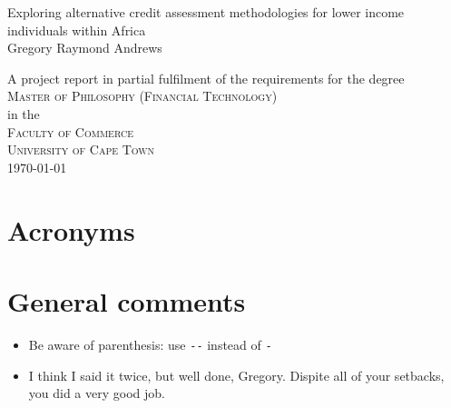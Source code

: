 \documentclass[a4paper,11pt,fleqn]{report}
\begin{document}
	
\thispagestyle{empty}


\begin{center}
	{\huge Exploring alternative credit assessment methodologies for lower income individuals within Africa}
	\vspace{20mm} \\
	{\Large Gregory Raymond Andrews}
	\vfill
	
	A project report in partial fulfilment of the requirements for the degree \\
	\vspace{10mm}
	{\Large \textsc{Master of Philosophy (Financial Technology)}} \\
	\vfill
	in the \\
	\vspace{20mm}
	{\Large \textsc{Faculty of Commerce}}\\
	\vspace{10mm}
	{\Large\textsc{University of Cape Town}} \\
	\vfill
	\today
\end{center}



\tableofcontents
\listoffigures
\listoftables

\chapter*{Acronyms}
\begin{acronym}[ABCDEF]
\end{acronym}

\chapter*{General comments}
\begin{itemize}
	\item Be aware of parenthesis: use \verb|--| instead of \verb|-|
	\item I think I said it twice, but well done, Gregory. Dispite all of your setbacks, you did a very good job.
\end{itemize}
\end{document}
